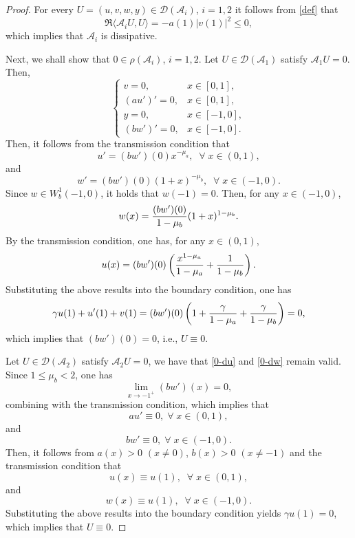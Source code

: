 \documentclass[twoside]{article}
\theoremstyle{noparens}
\theoremstyle{definition}
\numberwithin{equation}{section}
\numberwithin{figure}{section}
\begin{document}
\begin{proof}
For every $U=(u,v,w,y)\in\mathcal D(\mathcal A_i)$, $i=1,2$ it follows from \eqref{def} that
$$\Re \langle \mathcal A_iU,U \rangle = - a(1)\left|v(1)\right|^2 \leq 0,$$
which implies that $\mathcal A_i$ is dissipative.

Next, we shall show that $0\in\rho(\mathcal A_i)$, $i=1,2$. Let $U\in\mathcal D(\mathcal A_1)$ satisfy $\mathcal A_1 U = 0$.  Then,
\begin{equation}
	\begin{cases}
		v=0, &x\in[0,1],\\
		(au')' = 0,&x\in[0,1],\\
		y = 0,&x\in[-1,0],\\
		(bw')' =0,&x\in[-1,0].
	\end{cases}
\end{equation}
Then, it follows from the transmission condition that
\begin{equation}\label{0-du}
	u' = (bw')(0)x^{-\mu_a},\;\;\forall\;x\in(0,1),
\end{equation}
and
\begin{equation}\label{0-dw}
	w' = (bw')(0)(1+x)^{-\mu_b},\;\;\forall\;x\in(-1,0).
\end{equation}
Since $w\in W_b^1(-1,0)$, it holds that $w(-1) = 0$. Then, for any $x\in(-1,0)$,
$$ w(x)= {(bw')(0)\over1-\mu_b}(1+x)^{1-\mu_b}. $$
By the transmission condition, one has, for any $x\in(0,1)$,
\begin{equation}
	\begin{split}
		u(x) =(bw')(0)\left({x^{1-\mu_a}\over 1-\mu_a} + {1\over1-\mu_b}\right).
	\end{split}
\end{equation}
Substituting the above results into the boundary condition, one has
$$\gamma u(1)+u'(1)+v(1) = (bw')(0) \left(1 + {\gamma\over1-\mu_a} +{\gamma\over1-\mu_b}\right) = 0,$$
which implies that $(bw')(0) = 0$, i.e., $U\equiv0$.

Let $U\in\mathcal D(\mathcal A_2)$ satisfy $\mathcal A_2U=0$, we have that \eqref{0-du} and \eqref{0-dw} remain valid. Since $1\leq\mu_b<2$, one has
\begin{equation*}
	\lim_{x\rightarrow -1^+} (bw')(x) = 0,
\end{equation*}
combining with the transmission condition, which implies that
$$au'\equiv 0,\;\forall\; x\in(0,1),$$and
$$bw'\equiv 0,\;\forall\; x\in(-1,0).$$
Then, it follows from $a(x)>0$ $(x\neq0)$, $b(x)>0$ $(x\neq-1)$ and the transmission condition that
$$u(x)\equiv u(1),\;\;\forall\;x\in(0,1),$$
and $$ w(x) \equiv u(1),\;\;\forall\; x\in(-1,0).$$
Substituting the above results into the boundary condition yields
$\gamma u(1) = 0$,
which implies that $U\equiv 0$.


\end{proof}
\end{document}
